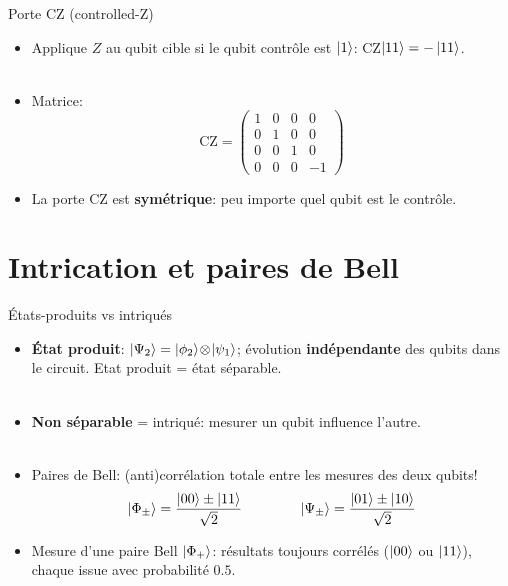 \documentclass[aspectratio=169,12pt]{beamer}
\begin{document}
\begin{frame}{Porte CZ (controlled-Z)}
  \begin{itemize}[<+->]
    \setlength{\itemsep}{0.55em}
    \item Applique $Z$ au qubit cible si le qubit contrôle est $\ket{1}$:
     CZ$\ket{11} = -\ket{11}$.\\~\\
    \item Matrice:
    $$\text{CZ} = \begin{pmatrix} 1&0&0&0 \\ 0&1&0&0 \\ 0&0&1&0 \\ 0&0&0&-1 \end{pmatrix}$$
    \item La porte CZ est \textbf{symétrique}: peu importe quel qubit est le contrôle.
  \end{itemize}
\end{frame}

\section{Intrication et paires de Bell}

\begin{frame}{États-produits vs intriqués}
  \begin{itemize}[<+->]
    \item \textbf{État produit}: $\ket{\Psi_2}=\ket{\phi_2}\!\otimes\!\ket{\psi_1}$; évolution \textbf{indépendante} des qubits dans le circuit. Etat produit = état séparable.
    \\~\\
    \item \textbf{Non séparable} = intriqué: mesurer un qubit influence l'autre.
    \\~\\
    \item Paires de Bell: (anti)corrélation totale entre les mesures des deux qubits!
    \begin{align*}
      \ket{\Phi_{\pm}}=\frac{\ket{00}\pm\ket{11}}{\sqrt{2}}
      \qquad\qquad
      \ket{\Psi_{\pm}}=\frac{\ket{01}\pm\ket{10}}{\sqrt{2}}
    \end{align*}
    \item Mesure d'une paire Bell $\ket{\Phi_+}$: résultats toujours corrélés ($\ket{00}$ ou $\ket{11}$), chaque issue avec probabilité $0.5$.
  \end{itemize}
\end{frame}
\end{document}
